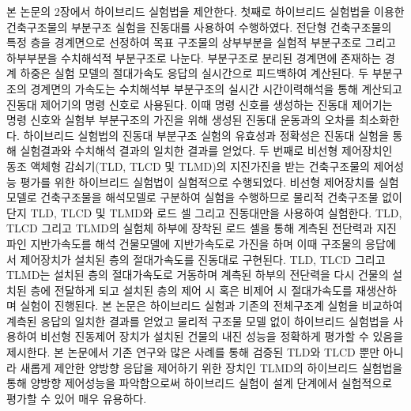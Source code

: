 본 논문의 2장에서 하이브리드 실험법을 제안한다. 첫째로 하이브리드 실험법을 이용한 건축구조물의 부분구조 실험을 진동대를 사용하여 수행하였다. 전단형 건축구조물의 특정 층을 경계면으로 선정하여 목표 구조물의 상부부분을 실험적 부분구조로 그리고 하부부분을 수치해석적 부분구조로 나눈다. 부분구조로 분리된 경계면에 존재하는 경계 하중은 실험 모델의 절대가속도 응답의 실시간으로 피드백하여 계산된다. 두 부분구조의 경계면의 가속도는 수치해석부 부분구조의 실시간 시간이력해석을 통해 계산되고 진동대 제어기의 명령 신호로 사용된다. 이때 명령 신호를 생성하는 진동대 제어기는 명령 신호와 실험부 부분구조의 가진을 위해 생성된 진동대 운동과의 오차를 최소화한다. 하이브리드 실험법의 진동대 부분구조 실험의 유효성과 정확성은 진동대 실험을 통해 실험결과와 수치해석 결과의 일치한 결과를 얻었다. 두 번째로 비선형 제어장치인 동조 액체형 감쇠기(TLD, TLCD 및 TLMD)의 지진가진을 받는 건축구조물의 제어성능 평가를 위한 하이브리드 실험법이 실험적으로 수행되었다. 비선형 제어장치를 실험모델로 건축구조물을 해석모델로 구분하여 실험을 수행하므로 물리적 건축구조물 없이 단지 TLD, TLCD 및 TLMD와 로드 셀 그리고 진동대만을 사용하여 실험한다. TLD, TLCD 그리고 TLMD의 실험체 하부에 장착된 로드 셀을 통해 계측된 전단력과 지진파인 지반가속도를 해석 건물모델에 지반가속도로 가진을 하며 이때 구조물의 응답에서 제어장치가 설치된 층의 절대가속도를 진동대로 구현된다. TLD, TLCD 그리고 TLMD는 설치된 층의 절대가속도로 거동하며 계측된 하부의 전단력을 다시 건물의 설치된 층에 전달하게 되고 설치된 층의 제어 시 혹은 비제어 시 절대가속도를 재생산하며 실험이 진행된다. 본 논문은 하이브리드 실험과 기존의 전체구조계 실험을 비교하여 계측된 응답의 일치한 결과를 얻었고 물리적 구조물 모델 없이 하이브리드 실험법을 사용하여 비선형 진동제어 장치가 설치된 건물의 내진 성능을 정확하게 평가할 수 있음을 제시한다. 본 논문에서 기존 연구와 많은 사례를 통해 검증된 TLD와 TLCD 뿐만 아니라 새롭게 제안한 양방향 응답을 제어하기 위한 장치인 TLMD의 하이브리드 실험법을 통해 양방향 제어성능을 파악함으로써 하이브리드 실험이 설계 단계에서 실험적으로 평가할 수 있어 매우 유용하다.

